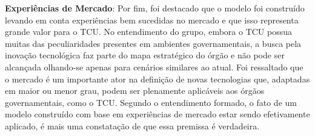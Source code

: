 {\textbf{Experiências de Mercado}: Por fim, foi destacado que o modelo foi construído
levando em conta experiências bem
sucedidas no mercado e que isso representa grande valor para o TCU. No entendimento
do grupo, embora o TCU possua muitas das peculiaridades presentes em ambientes governamentais,
a busca pela inovação tecnológica faz parte do mapa estratégico do órgão e
não pode ser alcançada olhando-se apenas para cenários similares ao atual. Foi ressaltado
que o mercado é um importante ator na definição de novas tecnologias que, adaptadas em
maior ou menor grau, podem ser plenamente aplicáveis aos órgãos governamentais, como
o TCU. Segundo o entendimento formado, o fato de um modelo construído com base em
experiências de mercado estar sendo efetivamente aplicado, é mais uma constatação de
que essa premissa é verdadeira.
}


